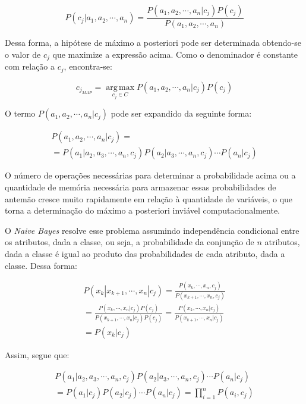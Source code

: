 \documentclass{article}
\begin{document}
\begin{equation}
P(c_j|a_1,a_2,\cdots,a_n) = \frac{P(a_1,a_2,\cdots,a_n|c_j) P(c_j)}{P(a_1,a_2,\cdots,a_n)}
\end{equation}

Dessa forma, a hipótese de máximo a posteriori pode ser determinada obtendo-se o valor de $c_j$ que maximize a expressão acima.
Como o denominador é constante com relação a $c_j$, encontra-se:

\begin {equation}
c_{j_{MAP}} = \operatorname*{arg\,max}_{c_j \in C} P(a_1,a_2,\cdots,a_n|c_j) P(c_j)
\end {equation}

O termo $P(a_1,a_2,\cdots,a_n|c_j)$ pode ser expandido da seguinte forma:

\small
\begin {multline}
P(a_1,a_2,\cdots,a_n|c_j) = \\
= P(a_1|a_2,a_3,\cdots,a_n,c_j) P(a_2|a_3,\cdots,a_n,c_j) \cdots P(a_n|c_j)
\end{multline}
\normalsize

O número de operações necessárias para determinar a probabilidade acima ou a quantidade de memória necessária para armazenar essas probabilidades de antemão cresce muito rapidamente em relação à quantidade de variáveis,
o que torna a determinação do máximo a posteriori inviável computacionalmente.

O {\it Naive Bayes} resolve esse problema assumindo independência condicional entre os atributos,
dada a classe, ou seja, a probabilidade da conjunção de $n$ atributos,
dada a classe é igual ao produto das probabilidades de cada atributo, dada a classe. Dessa forma:

\begin{multline}
P(x_k|x_{k+1},\cdots,x_n|c_j) = \frac{P(x_k,\cdots,x_n,c_j)}{P(x_{k+1},\cdots,x_n,c_j)} \\
= \frac{P(x_k,\cdots,x_n|c_j) P(c_j)}{P(x_{k+1},\cdots,x_n|c_j) P(c_j)} = \frac{P(x_k,\cdots,x_n|c_j)}{P(x_{k+1},\cdots,x_n|c_j)} \\
= P(x_k|c_j)
\end{multline}

Assim, segue que:

\small
\begin{multline}
P(a_1|a_2,a_3,\cdots,a_n,c_j) P(a_2|a_3,\cdots,a_n,c_j) \cdots P(a_n|c_j) \\
= P(a_1|c_j) P(a_2|c_j) \cdots P(a_n|c_j) = \prod_{i=1}^n P(a_i,c_j)
\end{multline}
\normalsize
\end{document}
